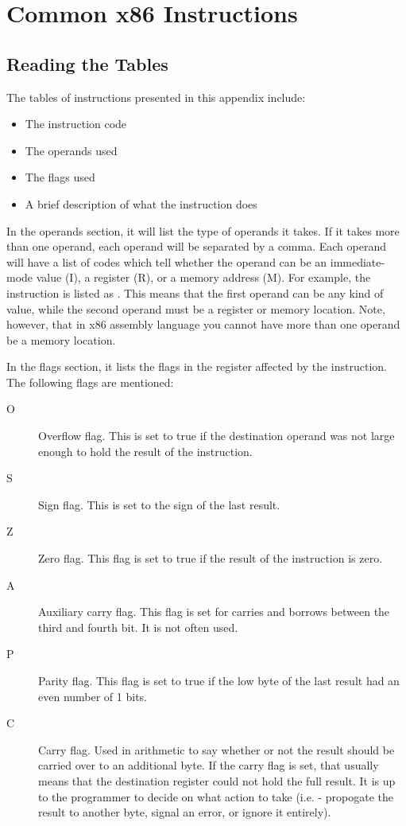 \chapter{Common x86 Instructions}
\label{instructionsappendix}

\section{Reading the Tables}

The tables of instructions presented in this appendix include:

\begin{itemize}\item The instruction code 
\item The operands used 
\item The flags used 
\item A brief description of what the instruction does 
\end{itemize}

In the operands section, it will list the type of operands it takes.  If
it takes more than one operand, each operand will be separated by a comma.
Each operand will have a list of codes which tell whether the operand can
be an immediate-mode value (I), a register (R), or a memory address (M).
For example, the  instruction is listed as
.  This means that the first operand can
be any kind of value, while the second operand must be a register or memory
location.  Note, however, that in x86 assembly language you cannot have more
than one operand be a memory location.

In the flags section, it lists the flags 
in the {\eflagsRegIdx} register affected by the instruction. 
The following flags are mentioned:

\begin{description}
\item[O] Overflow flag.  This is set to true if the destination operand was not large enough to hold the result of the instruction.
\item[S] Sign flag.  This is set to the sign of the last result.
\item[Z] Zero flag.  This flag is set to true if the result of the instruction is zero.
\item[A] Auxiliary carry flag.  This flag is set for carries and borrows between the third and fourth bit.  It is not often used.
\item[P] Parity flag.  This flag is set to true if the low byte of the last result had an even number of 1 bits.
\item[C] Carry flag.  Used in arithmetic to say whether or not the result should be carried over to an additional byte.  If the carry flag is set, that usually means
that the destination register could not hold the full result.  It is up to
the programmer to decide on what action to take (i.e. - propogate the result
to another byte, signal an error, or ignore it entirely).
\end{description}

